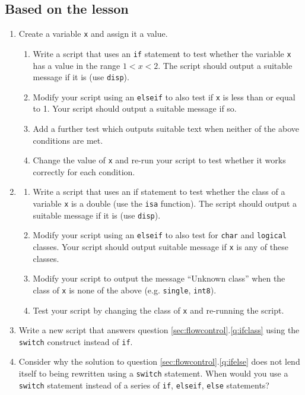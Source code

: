 \documentclass{article}
\begin{document}
	\subsection*{Based on the lesson}
	\begin{enumerate}
		\item Create a variable \texttt{x} and assign it a value.
		\label{q:ifelse}
		\begin{enumerate}
			\item Write a script that uses an \texttt{if} statement to test whether the variable \texttt{x} has a value in the range $1<x<2$. The script should output a suitable message if it is (use \texttt{disp}).
			\item Modify your script using an \texttt{elseif} to also test if \texttt{x} is less than or equal to 1. Your script should output a suitable message if so.
			\item Add a further test which outputs suitable text when neither of the above conditions are met.
			\item Change the value of \texttt{x} and re-run your script to test whether it works correctly for each condition.
		\end{enumerate}
		\item 
		\label{q:ifclass}
		\begin{enumerate}
			\item Write a script that uses an if statement to test whether the class of a variable \texttt{x} is a double (use the \texttt{isa} function). The script should output a suitable message if it is (use \texttt{disp}).
			\item Modify your script using an \texttt{elseif} to also test for \texttt{char} and \texttt{logical} classes. Your script should output suitable message if \texttt{x} is any of these classes.
			\item Modify your script to output the message ``Unknown class'' when the class of \texttt{x} is none of the above (e.g. \texttt{single}, \texttt{int8}).
			\item Test your script by changing the class of \texttt{x} and re-running the script.
		\end{enumerate}
		\item Write a new script that answers question \ref{sec:flowcontrol}.\ref{q:ifclass} using the \texttt{switch} construct instead of \texttt{if}.
		\item Consider why the solution to question \ref{sec:flowcontrol}.\ref{q:ifelse} does not lend itself to being rewritten using a \texttt{switch} statement. When would you use a \texttt{switch} statement instead of a series of \texttt{if}, \texttt{elseif}, \texttt{else} statements?

\end{enumerate}
\end{document}
